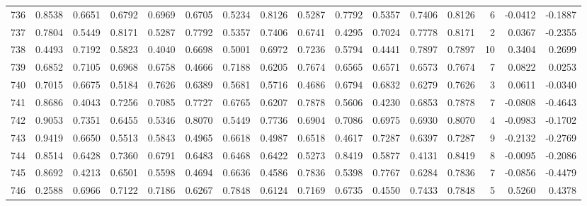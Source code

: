 \begin{tabular}{lrrrrrrrrrrrrrrr}
736 &      0.8538 &  0.6651 &  0.6792 &  0.6969 &  0.6705 &  0.5234 &  0.8126 &  0.5287 &  0.7792 &  0.5357 &   0.7406 &     0.8126 &      6 &                   -0.0412 &                    -0.1887 \\
737 &      0.7804 &  0.5449 &  0.8171 &  0.5287 &  0.7792 &  0.5357 &  0.7406 &  0.6741 &  0.4295 &  0.7024 &   0.7778 &     0.8171 &      2 &                    0.0367 &                    -0.2355 \\
738 &      0.4493 &  0.7192 &  0.5823 &  0.4040 &  0.6698 &  0.5001 &  0.6972 &  0.7236 &  0.5794 &  0.4441 &   0.7897 &     0.7897 &     10 &                    0.3404 &                     0.2699 \\
739 &      0.6852 &  0.7105 &  0.6968 &  0.6758 &  0.4666 &  0.7188 &  0.6205 &  0.7674 &  0.6565 &  0.6571 &   0.6573 &     0.7674 &      7 &                    0.0822 &                     0.0253 \\
740 &      0.7015 &  0.6675 &  0.5184 &  0.7626 &  0.6389 &  0.5681 &  0.5716 &  0.4686 &  0.6794 &  0.6832 &   0.6279 &     0.7626 &      3 &                    0.0611 &                    -0.0340 \\
741 &      0.8686 &  0.4043 &  0.7256 &  0.7085 &  0.7727 &  0.6765 &  0.6207 &  0.7878 &  0.5606 &  0.4230 &   0.6853 &     0.7878 &      7 &                   -0.0808 &                    -0.4643 \\
742 &      0.9053 &  0.7351 &  0.6455 &  0.5346 &  0.8070 &  0.5449 &  0.7736 &  0.6904 &  0.7086 &  0.6975 &   0.6930 &     0.8070 &      4 &                   -0.0983 &                    -0.1702 \\
743 &      0.9419 &  0.6650 &  0.5513 &  0.5843 &  0.4965 &  0.6618 &  0.4987 &  0.6518 &  0.4617 &  0.7287 &   0.6397 &     0.7287 &      9 &                   -0.2132 &                    -0.2769 \\
744 &      0.8514 &  0.6428 &  0.7360 &  0.6791 &  0.6483 &  0.6468 &  0.6422 &  0.5273 &  0.8419 &  0.5877 &   0.4131 &     0.8419 &      8 &                   -0.0095 &                    -0.2086 \\
745 &      0.8692 &  0.4213 &  0.6501 &  0.5598 &  0.4694 &  0.6636 &  0.4586 &  0.7836 &  0.5398 &  0.7767 &   0.6284 &     0.7836 &      7 &                   -0.0856 &                    -0.4479 \\
746 &      0.2588 &  0.6966 &  0.7122 &  0.7186 &  0.6267 &  0.7848 &  0.6124 &  0.7169 &  0.6735 &  0.4550 &   0.7433 &     0.7848 &      5 &                    0.5260 &                     0.4378 \\

\end{tabular}
